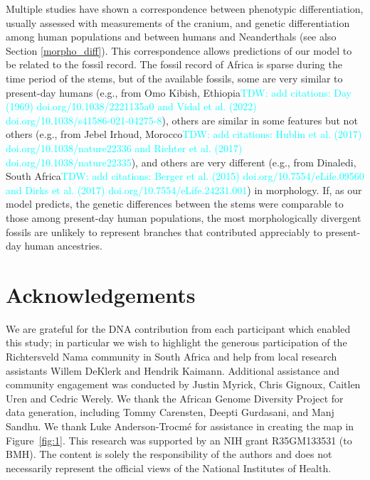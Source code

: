 \documentclass[]{article}
\newcommand{\tdwcomment}[1]{{\textcolor{cyan}{TDW: #1}}}
\begin{document}
Multiple studies have shown a correspondence between phenotypic
differentiation, usually assessed with measurements of the cranium, and genetic
differentiation among human populations and between humans and Neanderthals
\citep{Relethford1994-mh,Weaver2008-ho,Von_Cramon-Taubadel2009-zb} (see also Section \ref{morpho_diff}). This correspondence allows predictions of our model to be related to the fossil record. The fossil
record of Africa is sparse during the time period of the stems, but of the
available fossils, some are very similar to present-day humans (e.g., from Omo
Kibish, Ethiopia\tdwcomment{add citations: Day (1969) doi.org/10.1038/2221135a0 and Vidal et al. (2022) doi.org/10.1038/s41586-021-04275-8}), others are similar in some features but not others (e.g.,
from Jebel Irhoud, Morocco\tdwcomment{add citations: Hublin et al. (2017) doi.org/10.1038/nature22336 and Richter et al. (2017) doi.org/10.1038/nature22335}), and others are very different (e.g., from
Dinaledi, South Africa\tdwcomment{add citations: Berger et al. (2015) doi.org/10.7554/eLife.09560 and Dirks et al. (2017) doi.org/10.7554/eLife.24231.001}) in morphology. If, as our model predicts, the
genetic differences between the stems were comparable to those among
present-day human populations, the most morphologically divergent fossils are unlikely to
represent branches that contributed appreciably to present-day human
ancestries.

\section*{Acknowledgements}

We are grateful for the DNA contribution from each participant which enabled
this study; in particular we wish to highlight the generous participation of
the Richtersveld Nama community in South Africa and help from local research
assistants Willem DeKlerk and Hendrik Kaimann. Additional assistance and
community engagement was conducted by Justin Myrick, Chris Gignoux, Caitlen
Uren and Cedric Werely. We thank the African Genome Diversity Project for data
generation, including Tommy Carensten, Deepti Gurdasani, and Manj Sandhu. We
thank Luke Anderson-Trocm\'e for assistance in creating the map in
Figure~\ref{fig:1}. This research was supported by an NIH grant R35GM133531 (to
BMH). The content is solely the responsibility of the authors and does
not necessarily represent the official views of the National Institutes of
Health.



\end{document}
